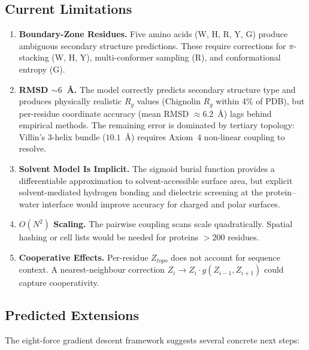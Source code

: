 \subsection{Current Limitations}

\begin{enumerate}
    \item \textbf{Boundary-Zone Residues.} Five amino acids (W, H, R, Y, G) produce ambiguous secondary structure predictions. These require corrections for $\pi$-stacking (W, H, Y), multi-conformer sampling (R), and conformational entropy (G).
    \item \textbf{RMSD $\sim 6$~\AA.} The model correctly predicts secondary structure type and produces physically realistic $R_g$ values (Chignolin $R_g$ within 4\% of PDB), but per-residue coordinate accuracy (mean RMSD $\approx 6.2$~\AA) lags behind empirical methods. The remaining error is dominated by tertiary topology: Villin's 3-helix bundle ($10.1$~\AA) requires Axiom~4 non-linear coupling to resolve.
    \item \textbf{Solvent Model Is Implicit.} The sigmoid burial function provides a differentiable approximation to solvent-accessible surface area, but explicit solvent-mediated hydrogen bonding and dielectric screening at the protein--water interface would improve accuracy for charged and polar surfaces.
    \item \textbf{$O(N^2)$ Scaling.} The pairwise coupling scans scale quadratically. Spatial hashing or cell lists would be needed for proteins $> 200$ residues.
    \item \textbf{Cooperative Effects.} Per-residue $Z_{topo}$ does not account for sequence context. A nearest-neighbour correction $Z_i \to Z_i \cdot g(Z_{i-1}, Z_{i+1})$ could capture cooperativity.
\end{enumerate}

\subsection{Predicted Extensions}
\label{sec:protein_bridge}

The eight-force gradient descent framework suggests several concrete next steps:

